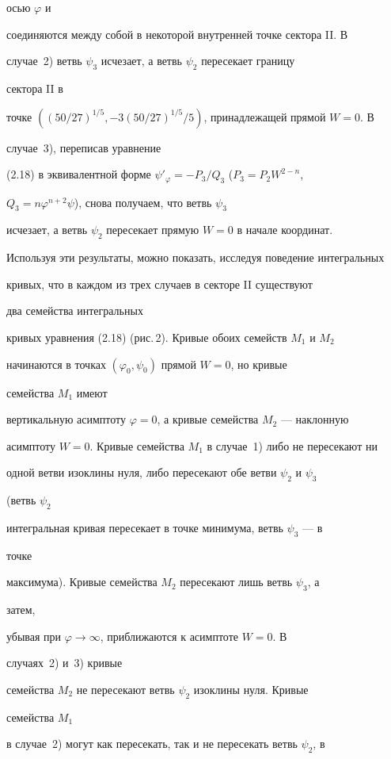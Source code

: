 осью $\varphi$ и 


соединяются между собой в некоторой внутренней точке сектора II. В 


случае~2) ветвь $\psi_3$ исчезает, а ветвь $\psi_2$ пересекает границу 


сектора II в 


точке $((50/27)^{1/5},-3(50/27)^{1/5}/5)$, принадлежащей прямой $W=0$. В 


случае~3), переписав уравнение 


(2.18) в эквивалентной форме $\psi'_\varphi=-P_3/Q_3$ ($P_3=P_2W^{2-n}$, 


$Q_3=n\varphi^{n+2}\psi$), снова получаем, что ветвь $\psi_3$ 


исчезает, а ветвь $\psi_2$ пересекает прямую $W=0$ в начале координат. 


Используя эти результаты, можно показать, исследуя поведение интегральных


кривых, что в каждом из трех случаев в секторе II существуют


два семейства интегральных 


кривых уравнения (2.18) (рис.\,2). Кривые обоих семейств $M_1$ и $M_2$ 


начинаются в точках $(\varphi_0,\psi_0)$ прямой $W=0$, но кривые 


семейства $M_1$ имеют 


вертикальную асимптоту $\varphi=0$, а кривые семейства $M_2$ --- наклонную 


асимптоту $W=0$. Кривые семейства $M_1$ в случае~1) либо не пересекают ни 


одной ветви изоклины нуля, либо пересекают обе ветви $\psi_2$ и $\psi_3$ 


(ветвь $\psi_2$ 


интегральная кривая пересекает в точке минимума, ветвь $\psi_3$ --- в 


точке 


максимума). Кривые семейства $M_2$ пересекают лишь ветвь $\psi_3$, а 


затем, 


убывая при $\varphi\to\infty$, приближаются к асимптоте $W=0$. В 


случаях~2) и~3) кривые 


семейства $M_2$ не пересекают ветвь $\psi_2$ изоклины нуля. Кривые 


семейства $M_1$ 


в случае~2) могут как пересекать, так и не пересекать ветвь $\psi_2$, в 


